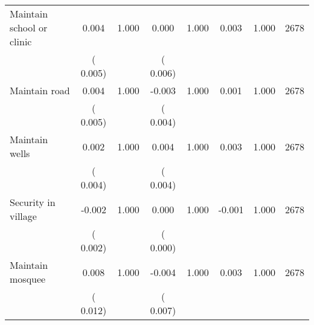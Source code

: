 \begin{tabular}{l*{7}{c}}
 Maintain school or clinic       &              0.004       &        1.000  &              0.000       &        1.000  &              0.003       &              1.000 &  2678 \\ 
                       &       (       0.005)             &                               &       (       0.006)                     &                               &                                               &                                &                      \\ 

 Maintain road       &              0.004       &        1.000  &             -0.003       &        1.000  &              0.001       &              1.000 &  2678 \\ 
                       &       (       0.005)             &                               &       (       0.004)                     &                               &                                               &                                &                      \\ 

 Maintain wells       &              0.002       &        1.000  &              0.004       &        1.000  &              0.003       &              1.000 &  2678 \\ 
                       &       (       0.004)             &                               &       (       0.004)                     &                               &                                               &                                &                      \\ 

 Security in village       &             -0.002       &        1.000  &              0.000       &        1.000  &             -0.001       &              1.000 &  2678 \\ 
                       &       (       0.002)             &                               &       (       0.000)                     &                               &                                               &                                &                      \\ 

 Maintain mosquee       &              0.008       &        1.000  &             -0.004       &        1.000  &              0.003       &              1.000 &  2678 \\ 
                       &       (       0.012)             &                               &       (       0.007)                     &                               &                                               &                                &                      \\ 


\end{tabular}
